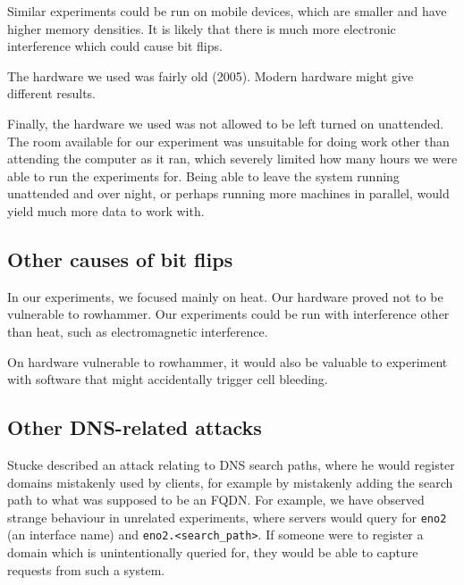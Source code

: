 \documentclass[conference]{IEEEtran}
\begin{document}
Similar experiments could be run on mobile devices, which are smaller and have
higher memory densities. It is likely that there is much more electronic
interference which could cause bit flips.

The hardware we used was fairly old (2005). Modern hardware might give
different results.

Finally, the hardware we used was not allowed to be left turned on unattended.
The room available for our experiment was unsuitable for doing work other than
attending the computer as it ran, which severely limited how many hours we were
able to run the experiments for. Being able to leave the system running
unattended and over night, or perhaps running more machines in parallel, would
yield much more data to work with.


\subsection{Other causes of bit flips}

In our experiments, we focused mainly on heat. Our hardware proved not to be
vulnerable to rowhammer. Our experiments could be run with interference other
than heat, such as electromagnetic interference.

On hardware vulnerable to rowhammer, it would also be valuable to experiment
with software that might accidentally trigger cell bleeding.

\subsection{Other DNS-related attacks}

Stucke\cite{suffixpath} described an attack relating to DNS search paths, where
he would register domains mistakenly used by clients, for example by mistakenly
adding the search path to what was supposed to be an FQDN. For example, we have
observed strange behaviour in unrelated experiments, where servers would query
for \texttt{eno2} (an interface name) and \texttt{eno2.<search\_path>}. If
someone were to register a domain which is unintentionally queried for, they
would be able to capture requests from such a system.


\printbibliography


\end{document}
